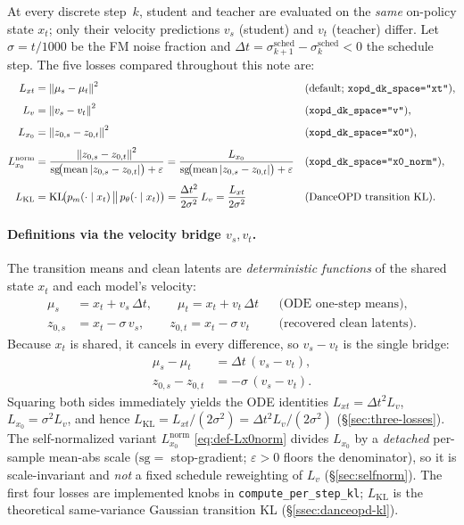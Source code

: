 \documentclass[11pt,a4paper]{article}
\newcommand{\norm}[1]{\left\lVert #1 \right\rVert}
\newcommand{\dt}{\Delta t}
\newcommand{\KL}{\mathrm{KL}}
\begin{document}
At every discrete step~$k$, student and teacher are evaluated on the \emph{same} on-policy state
$x_t$; only their velocity predictions $v_s$ (student) and $v_t$ (teacher) differ. Let
$\sigma=t/1000$ be the FM noise fraction and
$\dt=\sigma^{\mathrm{sched}}_{k+1}-\sigma^{\mathrm{sched}}_k<0$ the schedule step. The five
losses compared throughout this note are:
\begin{align}
L_{xt}
  &= \norm{\mu_s-\mu_t}^2
  &&\text{(default; \texttt{xopd\_dk\_space="xt"})},
\label{eq:def-Lxt}\\[0.35em]
L_v
  &= \norm{v_s-v_t}^2
  &&\text{(\texttt{xopd\_dk\_space="v"})},
\label{eq:def-Lv}\\[0.35em]
L_{x_0}
  &= \norm{z_{0,s}-z_{0,t}}^2
  &&\text{(\texttt{xopd\_dk\_space="x0"})},
\label{eq:def-Lx0}\\[0.35em]
L_{x_0}^{\mathrm{norm}}
  &= \frac{\norm{z_{0,s}-z_{0,t}}^2}
          {\mathrm{sg}\!\big(\mathrm{mean}\,|z_{0,s}-z_{0,t}|\big)+\varepsilon}
  = \frac{L_{x_0}}
          {\mathrm{sg}\!\big(\mathrm{mean}\,|z_{0,s}-z_{0,t}|\big)+\varepsilon}
  &&\text{(\texttt{xopd\_dk\_space="x0\_norm"})},
\label{eq:def-Lx0norm}\\[0.35em]
L_{\mathrm{KL}}
  &= \KL\!\bigl(p_m(\cdot\mid x_t)\,\big\|\,p_\theta(\cdot\mid x_t)\bigr)
  = \frac{\dt^2}{2\sigma^2}\,L_v
  = \frac{L_{xt}}{2\sigma^2}
  &&\text{(DanceOPD transition KL)}.
\label{eq:def-Lkl}
\end{align}

\paragraph{Definitions via the velocity bridge $v_s,v_t$.}
The transition means and clean latents are \emph{deterministic functions} of the shared state
$x_t$ and each model's velocity:
\begin{align}
\mu_s &= x_t + v_s\,\dt,
\qquad
\mu_t = x_t + v_t\,\dt
&&\text{(ODE one-step means)},
\label{eq:def-mu}\\
z_{0,s} &= x_t - \sigma\,v_s,
\qquad
z_{0,t} = x_t - \sigma\,v_t
&&\text{(recovered clean latents)}.
\label{eq:def-z0}
\end{align}
Because $x_t$ is shared, it cancels in every difference, so $v_s-v_t$ is the single bridge:
\begin{align}
\mu_s-\mu_t &= \dt\,(v_s-v_t),
\label{eq:bridge-mu}\\
z_{0,s}-z_{0,t} &= -\sigma\,(v_s-v_t).
\label{eq:bridge-z0}
\end{align}
Squaring both sides immediately yields the ODE identities
$L_{xt}=\dt^2 L_v$, $L_{x_0}=\sigma^2 L_v$, and hence
$L_{\mathrm{KL}}=L_{xt}/(2\sigma^2)=\dt^2 L_v/(2\sigma^2)$
(\S\ref{sec:three-losses}). The self-normalized variant $L_{x_0}^{\mathrm{norm}}$
\eqref{eq:def-Lx0norm} divides $L_{x_0}$ by a \emph{detached} per-sample mean-abs scale
($\mathrm{sg}=$ stop-gradient; $\varepsilon>0$ floors the denominator), so it is
scale-invariant and \emph{not} a fixed schedule reweighting of $L_v$
(\S\ref{sec:selfnorm}). The first four losses are implemented knobs in
\texttt{compute\_per\_step\_kl}; $L_{\mathrm{KL}}$ is the theoretical same-variance Gaussian
transition KL (\S\ref{ssec:danceopd-kl}).
\end{document}

